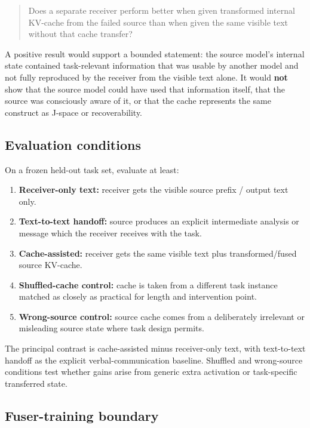 \begin{quote}
Does a separate receiver perform better when given transformed internal KV-cache from the failed source than when given the same visible text without that cache transfer?
\end{quote}

A positive result would support a bounded statement: the source model's internal state contained task-relevant information that was usable by another model and not fully reproduced by the receiver from the visible text alone. It would \textbf{not} show that the source model could have used that information itself, that the source was consciously aware of it, or that the cache represents the same construct as J-space or recoverability.

\subsection{Evaluation conditions}\label{cache-transfer-conditions}

On a frozen held-out task set, evaluate at least:

\begin{enumerate}
\tightlist
\item \textbf{Receiver-only text:} receiver gets the visible source prefix / output text only.
\item \textbf{Text-to-text handoff:} source produces an explicit intermediate analysis or message which the receiver receives with the task.
\item \textbf{Cache-assisted:} receiver gets the same visible text plus transformed/fused source KV-cache.
\item \textbf{Shuffled-cache control:} cache is taken from a different task instance matched as closely as practical for length and intervention point.
\item \textbf{Wrong-source control:} source cache comes from a deliberately irrelevant or misleading source state where task design permits.
\end{enumerate}

The principal contrast is cache-assisted minus receiver-only text, with text-to-text handoff as the explicit verbal-communication baseline. Shuffled and wrong-source conditions test whether gains arise from generic extra activation or task-specific transferred state.

\subsection{Fuser-training boundary}\label{cache-transfer-training-boundary}

